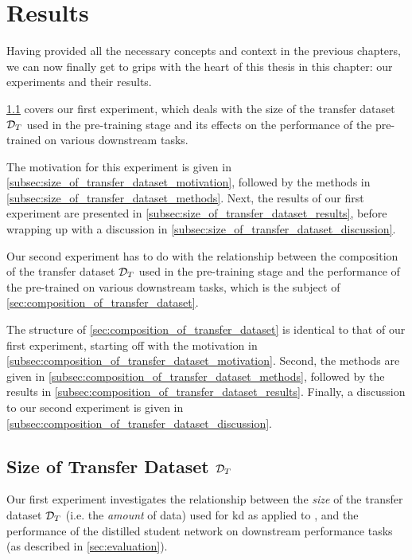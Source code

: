 \chapter{Results}
\label{ch:experiments}
\glsresetall
Having provided all the necessary concepts and context in the previous chapters, we can now finally get to grips with the heart of this thesis in this chapter: our experiments and their results.

\cref{sec:size_of_transfer_dataset} covers our first experiment, which deals with the size of the transfer dataset $\mathcal{D}_T$ used in the pre-training stage and its effects on the performance of the pre-trained \bertstudent on various downstream tasks.

The motivation for this experiment is given in \cref{subsec:size_of_transfer_dataset_motivation}, followed by the methods in \cref{subsec:size_of_transfer_dataset_methods}. Next, the results of our first experiment are presented in \cref{subsec:size_of_transfer_dataset_results}, before wrapping up with a discussion in \cref{subsec:size_of_transfer_dataset_discussion}.

Our second experiment has to do with the relationship between the composition of the transfer dataset $\mathcal{D}_T$ used in the pre-training stage and the performance of the pre-trained \bertstudent on various downstream tasks, which is the subject of \cref{sec:composition_of_transfer_dataset}.

The structure of \cref{sec:composition_of_transfer_dataset} is identical to that of our first experiment, starting off with the motivation in \cref{subsec:composition_of_transfer_dataset_motivation}. Second, the methods are given in \cref{subsec:composition_of_transfer_dataset_methods}, followed by the results in \cref{subsec:composition_of_transfer_dataset_results}. Finally, a discussion to our second experiment is given in \cref{subsec:composition_of_transfer_dataset_discussion}.





\section{Size of Transfer Dataset $\mathcal{D}_T$}
\label{sec:size_of_transfer_dataset}
Our first experiment investigates the relationship between the \emph{size} of the transfer dataset $\mathcal{D}_T$ (i.e. the \emph{amount} of data) used for \gls{kd} as applied to \bertbase, and the performance of the distilled student network on downstream performance tasks (as described in \cref{sec:evaluation}).



